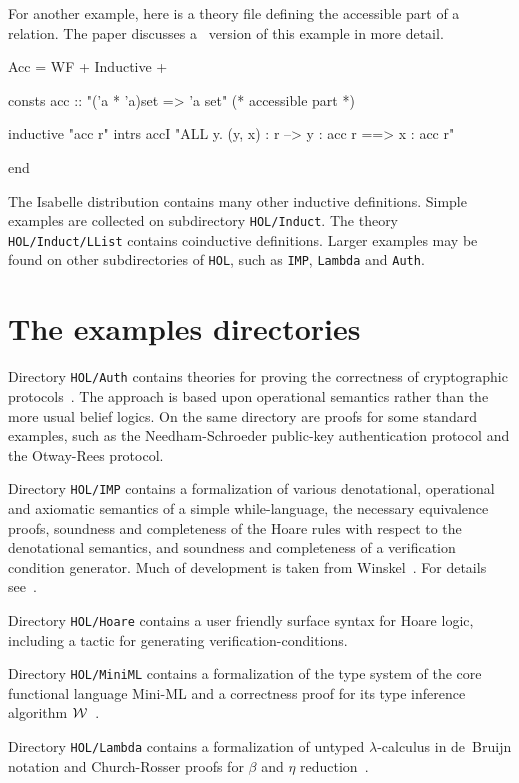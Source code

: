 For another example, here is a theory file defining the accessible
part of a relation.  The paper
\cite{paulson-CADE} discusses a \ZF\ version of this example in more
detail.
\begin{ttbox}
Acc = WF + Inductive +

consts acc :: "('a * 'a)set => 'a set"   (* accessible part *)

inductive "acc r"
  intrs
    accI "ALL y. (y, x) : r --> y : acc r ==> x : acc r"

end
\end{ttbox}
The Isabelle distribution contains many other inductive definitions.  Simple
examples are collected on subdirectory \texttt{HOL/Induct}.  The theory
\texttt{HOL/Induct/LList} contains coinductive definitions.  Larger examples
may be found on other subdirectories of \texttt{HOL}, such as \texttt{IMP},
\texttt{Lambda} and \texttt{Auth}.

 


\section{The examples directories}

Directory \texttt{HOL/Auth} contains theories for proving the correctness of
cryptographic protocols~\cite{paulson-jcs}.  The approach is based upon
operational semantics rather than the more usual belief logics.  On the same
directory are proofs for some standard examples, such as the Needham-Schroeder
public-key authentication protocol and the Otway-Rees
protocol.

Directory \texttt{HOL/IMP} contains a formalization of various denotational,
operational and axiomatic semantics of a simple while-language, the necessary
equivalence proofs, soundness and completeness of the Hoare rules with
respect to the denotational semantics, and soundness and completeness of a
verification condition generator.  Much of development is taken from
Winskel~\cite{winskel93}.  For details see~\cite{nipkow-IMP}.

Directory \texttt{HOL/Hoare} contains a user friendly surface syntax for Hoare
logic, including a tactic for generating verification-conditions.

Directory \texttt{HOL/MiniML} contains a formalization of the type system of
the core functional language Mini-ML and a correctness proof for its type
inference algorithm $\cal W$~\cite{milner78,nipkow-W}.

Directory \texttt{HOL/Lambda} contains a formalization of untyped
$\lambda$-calculus in de~Bruijn notation and Church-Rosser proofs for $\beta$
and $\eta$ reduction~\cite{Nipkow-CR}.


